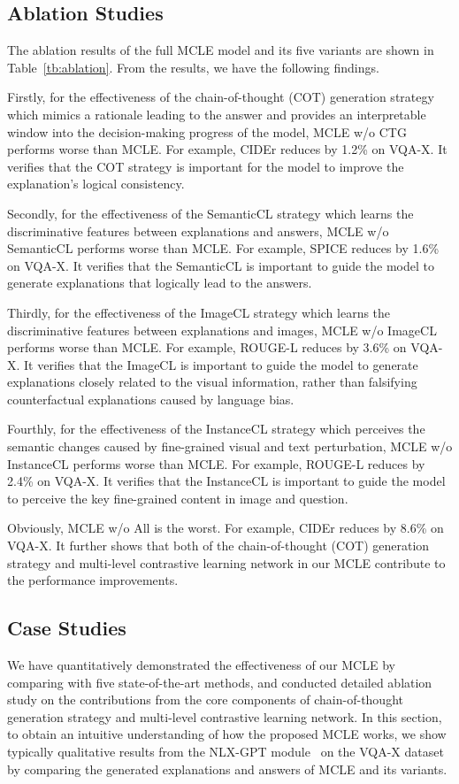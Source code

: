 \documentclass[letterpaper]{article} %
\begin{document}
\subsection{Ablation Studies}
The ablation results of the full MCLE model and its five variants are shown in Table~\ref{tb:ablation}. From the results, we have the following findings. 

Firstly, for the effectiveness of the chain-of-thought (COT) generation strategy which mimics a rationale leading to the answer and provides an interpretable window into the decision-making progress of the model, MCLE w/o CTG performs worse than MCLE. For example, CIDEr reduces by 1.2\% on VQA-X. It verifies that the COT strategy is important for the model to improve the explanation's logical consistency.

Secondly, for the effectiveness of the SemanticCL strategy which learns the discriminative features between explanations and answers, MCLE w/o SemanticCL performs worse than MCLE. For example, SPICE reduces by 1.6\% on VQA-X. It verifies that the SemanticCL is important to guide the model to generate explanations that logically lead to the answers.

Thirdly, for the effectiveness of the ImageCL strategy which learns the discriminative features between explanations and images, MCLE w/o ImageCL performs worse than MCLE. For example, ROUGE-L reduces by 3.6\% on VQA-X. It verifies that the ImageCL is important to guide the model to generate explanations closely related to the visual information, rather than falsifying counterfactual explanations caused by language bias.

Fourthly, for the effectiveness of the InstanceCL strategy which perceives the semantic changes caused by fine-grained visual and text perturbation, MCLE w/o InstanceCL performs worse than MCLE. For example, ROUGE-L reduces by 2.4\% on VQA-X. It verifies that the InstanceCL is important to guide the model to perceive the key fine-grained content in image and question.

Obviously, MCLE w/o All is the worst. For example, CIDEr reduces by 8.6\% on VQA-X. It further shows that both of the chain-of-thought (COT) generation strategy and multi-level contrastive learning network in our MCLE contribute to the performance improvements.


\subsection{Case Studies}
We have quantitatively demonstrated the effectiveness of our MCLE by comparing with five state-of-the-art methods, and conducted detailed ablation study on the contributions from the core components of chain-of-thought generation strategy and multi-level contrastive learning network. In this section, to obtain an intuitive understanding of how the proposed MCLE works, we show typically qualitative results from the NLX-GPT module~\cite{sammani2022nlx} on the VQA-X dataset by comparing the generated explanations and answers of MCLE and its variants.
\end{document}
